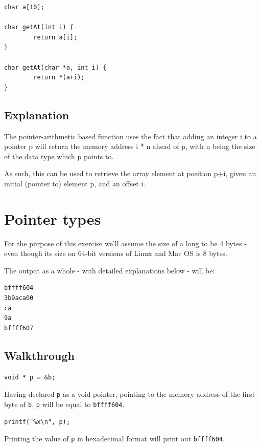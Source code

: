 \documentclass[a4paper]{scrartcl}
\begin{document}
\begin{lstlisting}
char a[10];

char getAt(int i) {
        return a[i];
}

char getAt(char *a, int i) {
        return *(a+i);
}
\end{lstlisting}

\subsection{Explanation}

The pointer-arithmetic based function uses the fact that adding an integer i to
a pointer p will return the memory address i * n ahead of p, with n being the
size of the data type which p points to.

As such, this can be used to retrieve the array element at position p+i, given
an initial (pointer to) element p, and an offset i.

\section{Pointer types}

For the purpose of this exercise we'll assume the size of a long to be 4 bytes
- even though its size on 64-bit versions of Linux and Mac OS is 8 bytes.

The output as a whole - with detailed explanations below - will be:

\begin{lstlisting}
bffff604
3b9aca00
ca
9a
bffff607
\end{lstlisting}


\subsection{Walkthrough}

\begin{lstlisting}
void * p = &b;
\end{lstlisting}

Having declared \texttt{p} as a void pointer, pointing to the memory address of
the first byte of \texttt{b}, \texttt{p} will be equal to \texttt{bffff604}.

\begin{lstlisting}
printf("%x\n", p);
\end{lstlisting}

Printing the value of \texttt{p} in hexadecimal format will print out
\texttt{bffff604}.
\end{document}
